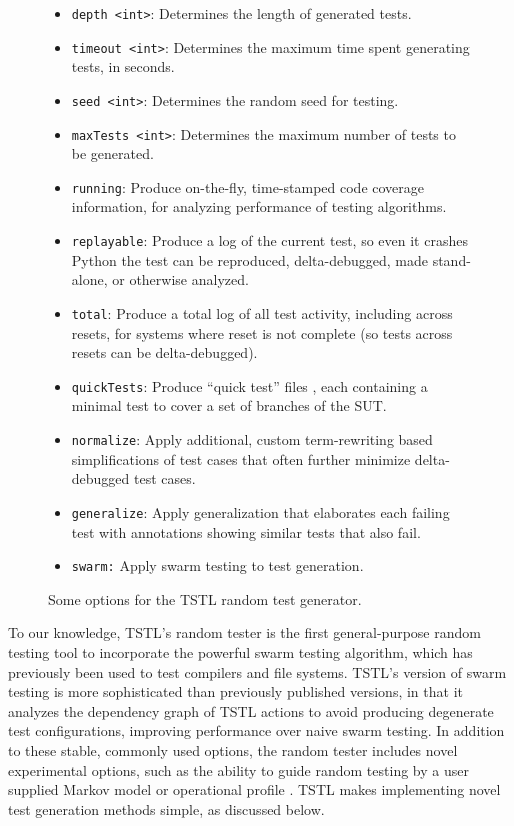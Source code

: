 \begin{figure}
{\scriptsize
\begin{itemize}
\item {\tt depth <int>}: Determines the length of generated tests.
\item {\tt timeout <int>}: Determines the maximum time spent generating tests, in seconds.
\item {\tt seed <int>}: Determines the random seed for testing.
\item {\tt maxTests <int>}: Determines the maximum number of tests to be generated.
\item {\tt running}: Produce on-the-fly, time-stamped code coverage information, for analyzing performance of testing algorithms. 
\item {\tt replayable}: Produce a log of the current test, so even it crashes Python the test can be reproduced, delta-debugged, made stand-alone, or otherwise analyzed.
\item {\tt total}: Produce a total log of all test activity, including across resets, for systems where reset is not complete (so tests across resets can be delta-debugged).
\item {\tt quickTests}:  Produce ``quick test'' files \cite{icst14}, each containing a minimal test to cover a set of branches of the SUT. 
\item {\tt normalize}: Apply additional, custom term-rewriting based simplifications of test cases that often further minimize delta-debugged test cases. 
\item {\tt generalize}: Apply generalization that elaborates each failing test with annotations showing similar tests that also fail. 
\item {\tt swarm:}  Apply swarm testing \cite{ISSTA12} to test generation.
\end{itemize}
}
\caption{Some options for the TSTL random test generator.}
\label{tab:rt}
\end{figure}

To our knowledge, TSTL's random tester is the first general-purpose random testing tool to incorporate the powerful swarm testing \cite{ISSTA12} algorithm, which has previously been used to test compilers \cite{ISSTA13,ZhendongPLDI14} and file systems.  TSTL's version of swarm testing is more sophisticated than previously published versions, in that it analyzes the dependency graph of TSTL actions to avoid producing degenerate test configurations, improving performance over naive swarm testing.  In addition to these stable, commonly used options, the random tester includes novel experimental options, such as the ability to guide random testing by a user supplied Markov model or operational profile \cite{Hamlet94}.  TSTL makes implementing novel test generation methods simple, as discussed below.


